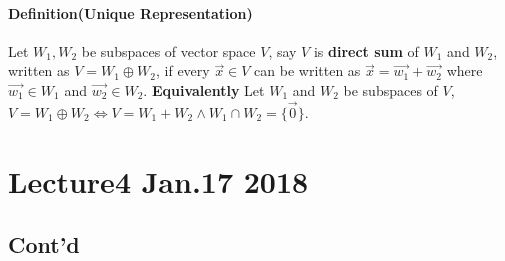\documentclass[11pt]{article}
\begin{document}
	\paragraph{Definition(Unique Representation)} Let $W_1, W_2$ be subspaces of vector space $V$, say $V$ is \textbf{direct sum} of $W_1$ and $W_2$, written as $V = W_1 \oplus W_2$, if every $\vec{x} \in V$ can be written  as $\vec{x} = \vec{w_1} + \vec{w_2}$ where $\vec{w_1} \in W_1$ and $\vec{w_2} \in W_2$.
	\newline
	\textbf{Equivalently} Let $W_1$ and $W_2$ be subspaces of $V$, $V = W_1 \oplus W_2 \iff V = W_1 + W_2 \land W_1 \cap W_2 = \{\vec{0}\}$.
	
	\section{Lecture4 Jan.17 2018}
	\subsection{Cont'd}
\end{document}
